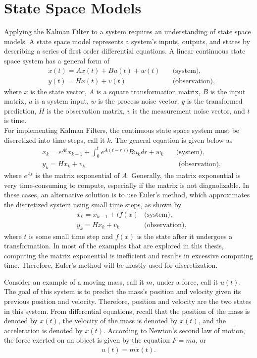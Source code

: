 \chapter{State Space Models}
\label{State Space Models}


Applying the Kalman Filter to a system requires an understanding of state space models. A state space model represents a system's inputs, outputs, and states by describing a series of first order differential equations. A linear continuous state space system has a general form of 
\begin{align*}
&\dot x(t)= A x(t) + B u(t) +w(t) \quad &\text{(system)}, \\
&y(t) = H x(t) +v(t) \quad &\text{(observation)} ,
\end{align*}
where $x$ is the state vector, $A$ is a square transformation matrix, $B$ is the input matrix, $u$ is a system input, $w$ is the process noise vector, $y$ is the transformed prediction, $H$ is the observation matrix, $v$ is the measurement noise vector, and $t$ is time. \\

\noindent For implementing Kalman Filters, the continuous state space system must be discretized into time steps, call it $k$. The general equation is given below as
\begin{align*}
& x_k= e^{At}x_{k-1} + \int_0^t e^{A(t-r))} B u_k dr + w_k \quad &\text{(system)}, \\
&y_k = H x_k + v_k  &\text{   (observation)} ,
\end{align*}
where $e^{At}$ is the matrix exponential of $A$. Generally, the matrix exponential is very time-consuming to compute, especially if the matrix is not diagnolizable. In these cases, an alternative solution is to use Euler's method, which approximates the discretized system using small time steps, as shown by 
\begin{align*}
& x_k= x_{k-1} + t f(x) &\text{(system)}, \\
&y_k = H x_k + v_k  &\text{(observation)},
\end{align*}
where $t$ is some small time step and $f(x)$ is the state after it undergoes a transformation. In most of the examples that are explored in this thesis, computing the matrix exponential is inefficient and results in excessive computing time. Therefore, Euler's method will be mostly used for discretization.

\noindent Consider an example of a moving mass, call it $m$, under a force, call it $u(t)$. The goal of this system is to predict the mass's position and velocity given its previous position and velocity. Therefore, position and velocity are the two states in this system. From differential equations, recall that the position of the mass is denoted by $x(t)$, the velocity of the mass is denoted by $\dot{x}(t)$, and the acceleration is denoted by $\ddot{x}(t)$. According to Newton's second law of motion, the force exerted on an object is given by the equation $F=ma$, or
\begin{align*}
u(t)=m\ddot{x}(t).
\end{align*}

